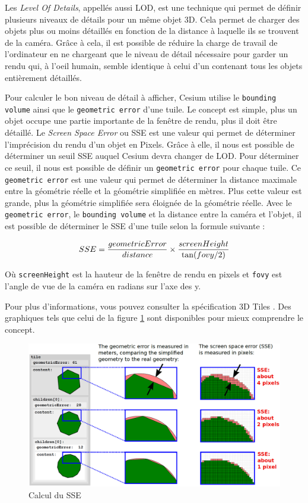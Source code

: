 Les \textit{Level Of Details}, appellés aussi LOD, est une technique qui permet de définir plusieurs niveaux de détails pour un même objet 3D. Cela permet de charger des objets plus ou moins détaillés en fonction de la distance à laquelle ils se trouvent de la caméra. Grâce à cela, il est possible de réduire la charge de travail de l'ordinateur en ne chargeant que le niveau de détail nécessaire pour garder un rendu qui, à l'oeil humain, semble identique à celui d'un contenant tous les objets entièrement détaillés.

Pour calculer le bon niveau de détail à afficher, Cesium utilise le \texttt{bounding volume} ainsi que le \texttt{geometric error} d'une tuile. Le concept est simple, plus un objet occupe une partie importante de la fenêtre de rendu, plus il doit être détaillé. Le \textit{Screen Space Error} ou SSE est une valeur qui permet de déterminer l'imprécision du rendu d'un objet en Pixels. Grâce à elle, il nous est possible de déterminer un seuil SSE auquel Cesium devra changer de LOD. Pour déterminer ce seuil, il nous est possible de définir un \texttt{geometric error} pour chaque tuile. Ce \texttt{geometric error} est une valeur qui permet de déterminer la distance maximale entre la géométrie réelle et la géométrie simplifiée en mètres. Plus cette valeur est grande, plus la géométrie simplifiée sera éloignée de la géométrie réelle. Avec le \texttt{geometric error}, le \texttt{bounding volume} et la distance entre la caméra et l'objet, il est possible de déterminer le SSE d'une tuile selon la formule suivante :

\begin{equation}
    \centering
    SSE = \frac{geometricError}{distance} \times \frac{screenHeight}{\tan(fovy/2)}
\end{equation}

Où \texttt{screenHeight} est la hauteur de la fenêtre de rendu en pixels et \texttt{fovy} est l'angle de vue de la caméra en radians sur l'axe des y.

Pour plus d'informations, vous pouvez consulter la spécification 3D Tiles \cite{3d-tiles-specification}. Des graphiques tels que celui de la figure \ref{fig:sse} sont disponibles pour mieux comprendre le concept.

\begin{figure}[H]
    \centering
    \includegraphics[width=1\textwidth]{assets/figures/sse.png}
    \caption{Calcul du SSE \cite{3d-tiles-specification}}
    \label{fig:sse}
\end{figure}
